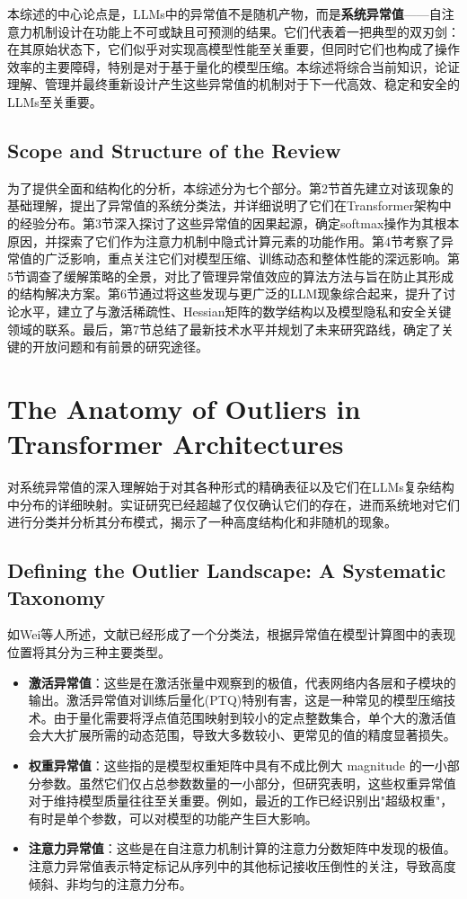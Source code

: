 \documentclass{article}
\begin{document}
本综述的中心论点是，LLMs中的异常值不是随机产物，而是\textbf{系统异常值}——自注意力机制设计在功能上不可或缺且可预测的结果。它们代表着一把典型的双刃剑：在其原始状态下，它们似乎对实现高模型性能至关重要，但同时它们也构成了操作效率的主要障碍，特别是对于基于量化的模型压缩。本综述将综合当前知识，论证理解、管理并最终重新设计产生这些异常值的机制对于下一代高效、稳定和安全的LLMs至关重要。

\subsection{Scope and Structure of the Review}

为了提供全面和结构化的分析，本综述分为七个部分。第2节首先建立对该现象的基础理解，提出了异常值的系统分类法，并详细说明了它们在Transformer架构中的经验分布。第3节深入探讨了这些异常值的因果起源，确定softmax操作为其根本原因，并探索了它们作为注意力机制中隐式计算元素的功能作用。第4节考察了异常值的广泛影响，重点关注它们对模型压缩、训练动态和整体性能的深远影响。第5节调查了缓解策略的全景，对比了管理异常值效应的算法方法与旨在防止其形成的结构解决方案。第6节通过将这些发现与更广泛的LLM现象综合起来，提升了讨论水平，建立了与激活稀疏性、Hessian矩阵的数学结构以及模型隐私和安全关键领域的联系。最后，第7节总结了最新技术水平并规划了未来研究路线，确定了关键的开放问题和有前景的研究途径。

\section{The Anatomy of Outliers in Transformer Architectures}

对系统异常值的深入理解始于对其各种形式的精确表征以及它们在LLMs复杂结构中分布的详细映射。实证研究已经超越了仅仅确认它们的存在，进而系统地对它们进行分类并分析其分布模式，揭示了一种高度结构化和非随机的现象。

\subsection{Defining the Outlier Landscape: A Systematic Taxonomy}

如Wei等人\cite{wei2023outlier}所述，文献已经形成了一个分类法，根据异常值在模型计算图中的表现位置将其分为三种主要类型。
  
  \begin{itemize}
  \item \textbf{激活异常值}：这些是在激活张量中观察到的极值，代表网络内各层和子模块的输出。激活异常值对训练后量化(PTQ)特别有害，这是一种常见的模型压缩技术。由于量化需要将浮点值范围映射到较小的定点整数集合，单个大的激活值会大大扩展所需的动态范围，导致大多数较小、更常见的值的精度显著损失。
  \item \textbf{权重异常值}：这些指的是模型权重矩阵中具有不成比例大 magnitude 的一小部分参数。虽然它们仅占总参数数量的一小部分，但研究表明，这些权重异常值对于维持模型质量往往至关重要。例如，最近的工作已经识别出"超级权重"，有时是单个参数，可以对模型的功能产生巨大影响。
  \item \textbf{注意力异常值}：这些是在自注意力机制计算的注意力分数矩阵中发现的极值。注意力异常值表示特定标记从序列中的其他标记接收压倒性的关注，导致高度倾斜、非均匀的注意力分布。
  \end{itemize}
\end{document}
